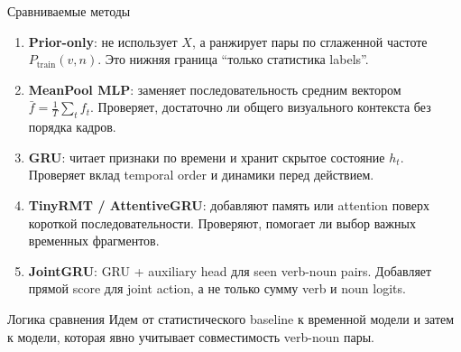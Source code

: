 \documentclass[aspectratio=169,10pt]{beamer}
\begin{document}
\begin{frame}{Сравниваемые методы}
    \small
    \begin{enumerate}
        \item \textbf{Prior-only}: не использует \(X\), а ранжирует пары по сглаженной частоте
        \(P_{\text{train}}(v,n)\). Это нижняя граница ``только статистика labels''.
        \item \textbf{MeanPool MLP}: заменяет последовательность средним вектором
        \(\bar f = \frac{1}{T}\sum_t f_t\). Проверяет, достаточно ли общего визуального контекста без порядка кадров.
        \item \textbf{GRU}: читает признаки по времени и хранит скрытое состояние \(h_t\).
        Проверяет вклад temporal order и динамики перед действием.
        \item \textbf{TinyRMT / AttentiveGRU}: добавляют память или attention поверх короткой последовательности.
        Проверяют, помогает ли выбор важных временных фрагментов.
        \item \textbf{JointGRU}: GRU + auxiliary head для seen verb-noun pairs.
        Добавляет прямой score для joint action, а не только сумму verb и noun logits.
    \end{enumerate}

    \vspace{0.25cm}
    \begin{block}{Логика сравнения}
        Идем от статистического baseline к временной модели и затем к модели,
        которая явно учитывает совместимость verb-noun пары.
    \end{block}
\end{frame}
\end{document}
